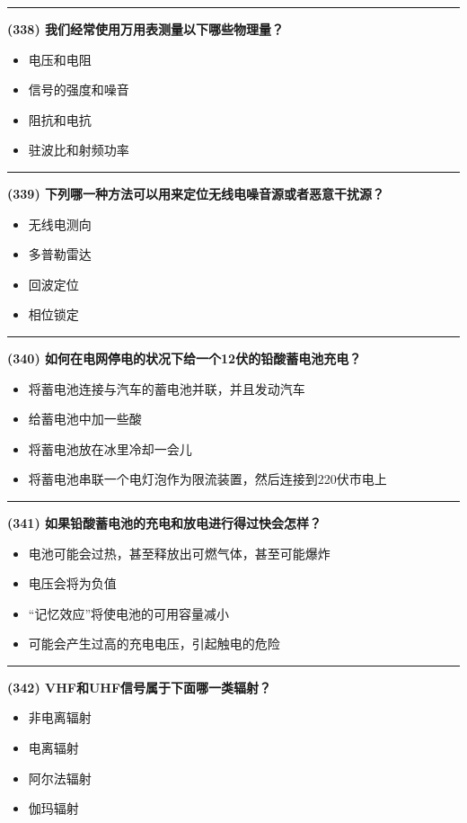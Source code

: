 \documentclass[twocolumn]{ctexart}  %
\begin{document}
\noindent\rule{0.5\textwidth}{1pt}
\heiti \textbf{(338) 我们经常使用万用表测量以下哪些物理量？} \songti {\color{gray} [LK1196] }
\begin{itemize}
	\item  电压和电阻
	\item  信号的强度和噪音
	\item  阻抗和电抗
	\item  驻波比和射频功率
\end{itemize}


\noindent\rule{0.5\textwidth}{1pt}
\heiti \textbf{(339) 下列哪一种方法可以用来定位无线电噪音源或者恶意干扰源？} \songti {\color{gray} [LK1206] }
\begin{itemize}
	\item  无线电测向
	\item  多普勒雷达
	\item  回波定位
	\item  相位锁定
\end{itemize}


\noindent\rule{0.5\textwidth}{1pt}
\heiti \textbf{(340) 如何在电网停电的状况下给一个12伏的铅酸蓄电池充电？} \songti {\color{gray} [LK1229] }
\begin{itemize}
	\item  将蓄电池连接与汽车的蓄电池并联，并且发动汽车
	\item  给蓄电池中加一些酸
	\item  将蓄电池放在冰里冷却一会儿
	\item  将蓄电池串联一个电灯泡作为限流装置，然后连接到220伏市电上
\end{itemize}


\noindent\rule{0.5\textwidth}{1pt}
\heiti \textbf{(341) 如果铅酸蓄电池的充电和放电进行得过快会怎样？} \songti {\color{gray} [LK1231] }
\begin{itemize}
	\item  电池可能会过热，甚至释放出可燃气体，甚至可能爆炸
	\item  电压会将为负值
	\item  “记忆效应”将使电池的可用容量减小
	\item  可能会产生过高的充电电压，引起触电的危险
\end{itemize}


\noindent\rule{0.5\textwidth}{1pt}
\heiti \textbf{(342) VHF和UHF信号属于下面哪一类辐射？} \songti {\color{gray} [LK1235] }
\begin{itemize}
	\item  非电离辐射
	\item  电离辐射
	\item  阿尔法辐射
	\item  伽玛辐射
\end{itemize}
\end{document}
